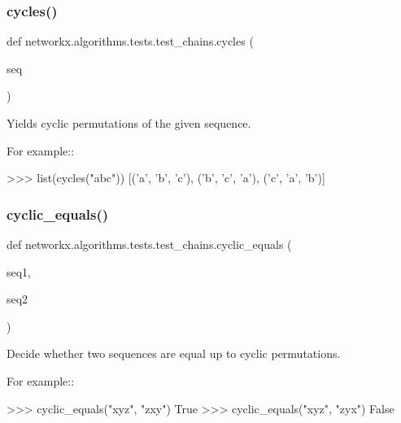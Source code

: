 \subsubsection{\texorpdfstring{cycles()}{cycles()}}
{\footnotesize\ttfamily def networkx.\+algorithms.\+tests.\+test\+\_\+chains.\+cycles (\begin{DoxyParamCaption}\item[{}]{seq }\end{DoxyParamCaption})}

\begin{DoxyVerb}Yields cyclic permutations of the given sequence.

For example::

    >>> list(cycles("abc"))
    [('a', 'b', 'c'), ('b', 'c', 'a'), ('c', 'a', 'b')]\end{DoxyVerb}
 \mbox{\label{namespacenetworkx_1_1algorithms_1_1tests_1_1test__chains_af14a5326f889f9a37ce0b1137415ce5e}} 
\subsubsection{\texorpdfstring{cyclic\+\_\+equals()}{cyclic\_equals()}}
{\footnotesize\ttfamily def networkx.\+algorithms.\+tests.\+test\+\_\+chains.\+cyclic\+\_\+equals (\begin{DoxyParamCaption}\item[{}]{seq1,  }\item[{}]{seq2 }\end{DoxyParamCaption})}

\begin{DoxyVerb}Decide whether two sequences are equal up to cyclic permutations.

For example::

    >>> cyclic_equals("xyz", "zxy")
    True
    >>> cyclic_equals("xyz", "zyx")
    False\end{DoxyVerb}
 